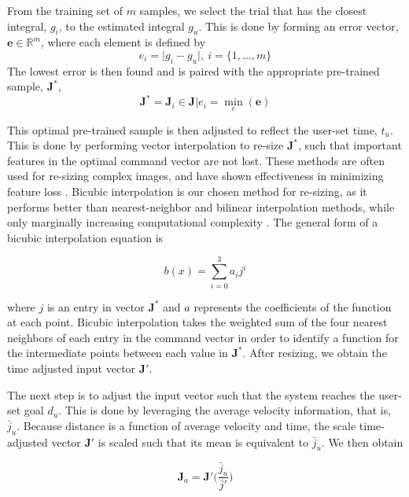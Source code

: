 \documentclass[letterpaper, 10 pt, conference]{ieeeconf}  %
\newcommand{\R}{\mathbb{R}}
\begin{document}
From the training set of $m$ samples, we select the trial that has the closest integral, $g_i$, to the estimated integral $g_u$. This is done by forming an error vector, $\bm{e}\in\R^{m}$, where each element is defined by
\begin{equation}
 e_i = \vert g_i-g_u \vert , ~i= \{1,\ldots,m\}
\end{equation}
 The lowest error is then found and is paired with the appropriate pre-trained sample, $\bm{J}^*$,
\begin{equation}
\bm{J}^* = \bm{J}_i \in \bm{J}\vert e_i = \min_e(\bm{e})
\end{equation}

This optimal pre-trained sample is then adjusted to reflect the user-set time, $t_u$. This is done by performing vector interpolation to re-size $\bm{J}^*$, such that important features in the optimal command vector are not lost. These methods are often used for re-sizing complex images, and have shown effectiveness in minimizing feature loss \cite{bicfeatures}. Bicubic interpolation is our chosen method for re-sizing, as it performs better than nearest-neighbor and bilinear interpolation methods, while only marginally increasing computational complexity \cite{biccomp}. The general form of a bicubic interpolation equation is 

\begin{equation} \label{eq:bicinter}
    b(x) = \sum_{i=0}^3a_ij^i
\end{equation}

where $j$ is an entry in vector $\bm{J}^*$ and $a$ represents the coefficients of the function at each point. Bicubic interpolation takes the weighted sum of the four nearest neighbors of each entry in the command vector in order to identify a function for the intermediate points between each value in $\bm{J}^*$. After resizing, we obtain the time adjusted input vector $\bm{J}'$.

The next step is to adjust the input vector such that the system reaches the user-set goal $d_u$. This is done by leveraging the average velocity information, that is, $\bar{j}_u$. Because distance is a function of average velocity and time, the scale time-adjusted vector $\bm{J}'$ is scaled such that its mean is equivalent to $\bar{j}_u$. We then obtain

\begin{equation} \label{eq:imgscale}
\bm{J}_a = \bm{J}'\bigg(\frac{\bar{j}_u}{\bar{j}'}\bigg)
\end{equation}
\end{document}
